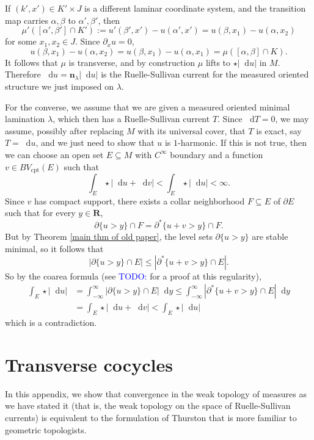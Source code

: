 \documentclass[final,12pt, leqno]{brownthesis}
\newcommand{\todo}[1]{\textcolor{blue}{TODO: #1}}
\newcommand{\RR}{\mathbf{R}}
\newcommand*\dif{\mathop{}\!\mathrm{d}}
\newcommand{\normal}{\mathbf n}
\newcommand{\cpt}{\mathrm{cpt}}
\theoremstyle{definition}
\numberwithin{equation}{section}
\begin{document}
If $(k', x') \in K' \times J$ is a different laminar coordinate system, and the transition map carries $\alpha, \beta$ to $\alpha', \beta'$, then
$$\mu'([\alpha', \beta'] \cap K') := u'(\beta', x') - u(\alpha', x') = u(\beta, x_1) - u(\alpha, x_2)$$
for some $x_1, x_2 \in J$. Since $\partial_x u = 0$,
$$u(\beta, x_1) - u(\alpha, x_2) = u(\beta, x_1) - u(\alpha, x_1) = \mu([\alpha, \beta] \cap K).$$
It follows that $\mu$ is transverse, and by construction $\mu$ lifts to $\star |\dif u|$ in $M$.
Therefore $\dif u = \normal_\lambda |\dif u|$ is the Ruelle-Sullivan current for the measured oriented structure we just imposed on $\lambda$.

For the converse, we assume that we are given a measured oriented minimal lamination $\lambda$, which then has a Ruelle-Sullivan current $T$.
Since $\dif T = 0$, we may assume, possibly after replacing $M$ with its universal cover, that $T$ is exact, say $T = \dif u$, and we just need to show that $u$ is $1$-harmonic.
If this is not true, then we can choose an open set $E \subseteq M$ with $C^\infty$ boundary and a function $v \in BV_\cpt(E)$ such that
$$\int_E \star |\dif u + \dif v| < \int_E \star |\dif u| < \infty.$$
Since $v$ has compact support, there exists a collar neighborhood $F \subseteq E$ of $\partial E$ such that for every $y \in \RR$,
$$\partial \{u > y\} \cap F = \partial^* \{u + v > y\} \cap F.$$
But by Theorem \ref{main thm of old paper}, the level sets $\partial \{u > y\}$ are stable minimal, so it follows that
$$|\partial \{u > y\} \cap E| \leq |\partial^* \{u + v > y\} \cap E|.$$
So by the coarea formula (see \todo{\cite{BackusFLG}} for a proof at this regularity),
\begin{align*}
\int_E \star |\dif u| &= \int_{-\infty}^\infty |\partial \{u > y\} \cap E| \dif y \leq \int_{-\infty}^\infty |\partial^* \{u + v > y\} \cap E| \dif y \\
&= \int_E \star |\dif u + \dif v| < \int_E \star |\dif u|
\end{align*}
which is a contradiction.




\section{Transverse cocycles}\label{transverse curves}
In this appendix, we show that convergence in the weak topology of measures as we have stated it (that is, the weak topology on the space of Ruelle-Sullivan currents) is equivalent to the formulation of Thurston \cite[\S8.6]{thurston1979geometry} that is more familiar to geometric topologists.
\end{document}
